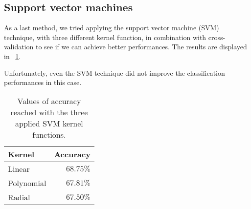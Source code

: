 \subsection{Support vector machines}

As a last method, we tried applying the support vector machine (SVM) technique, with three different kernel function, in combination with cross-validation to see if we can achieve better performances. The results are displayed in \Tab~\ref{table:SVMkernels}.

Unfortunately, even the SVM technique did not improve the classification performances in this case. 

\begin{table}[H]
	\centering
	\begin{tabular}{|| l | r ||} 
		\hline
		Kernel & Accuracy \\
		\hline
		\hline
		Linear & $68.75\%$ \\
		\hline
		Polynomial & $67.81\%$ \\
		\hline
		Radial & $67.50\%$ \\
		\hline
	\end{tabular}
	\caption{Values of accuracy reached with the three applied SVM kernel functions.}
	\label{table:SVMkernels}
\end{table}